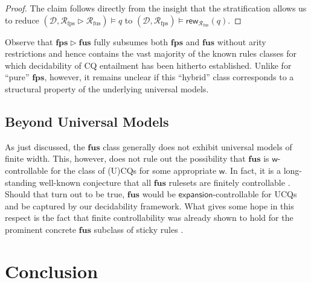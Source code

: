 \documentclass[10pt,a4paper]{amsart}
\theoremstyle{definition}
\numberwithin{equation}{section}
\theoremstyle{plain}
\theoremstyle{definition}
\theoremstyle{myexample}
\theoremstyle{plain}
\theoremstyle{definition}
\newcommand{\database}{\mathcal{D}}
\newcommand{\db}{\database}
\newcommand{\cut}{\triangleright}
\newcommand{\fcn}[1]{\mathsf{#1}}
\newcommand{\ruleset}{\calr}
\newcommand{\fus}{\mathbf{fus}}
\newcommand{\fps}{\mathbf{fps}} %
\newcommand{\hcs}{\fps}
\newcommand{\fhcs}{\hcs}
\newcommand{\rewrs}[2]{\fcn{rew}_{#1}(#2)}
\newcommand{\calr}{\mathcal{R}}
\newcommand{\query}{q}
\begin{document}
\begin{proof} The claim follows directly from the insight that the stratification allows us to reduce  $(\db,\ruleset_\mathrm{fps} \cut \ruleset_\mathrm{fus}) \models \query$ to
$(\db,\ruleset_\mathrm{fps}) \models \rewrs{\ruleset_\mathrm{fus}}{\query}$.
\end{proof}

Observe that $\fhcs \cut \fus$ fully subsumes both $\fhcs$ and $\fus$ without arity restrictions and hence contains the vast majority of the known rules classes for which decidability of CQ entailment has been hitherto established. Unlike for ``pure'' $\fhcs$, however, it remains unclear if this ``hybrid'' class corresponds to a structural property of the underlying universal models.  


\subsection{Beyond Universal Models}
%
As just discussed, the $\fus$ class generally does not exhibit universal models of finite width. This, however, does not rule out the possibility that $\fus$ is $\fcn{w}$-controllable for the class of (U)CQs for some appropriate $\fcn{w}$. In fact, it is a long-standing well-known conjecture that all $\fus$ rulesets are finitely controllable \cite{GogaczM13a,GogaczM13}. Should that turn out to be true, $\fus$ would be $\fcn{expansion}$-controllable for UCQs and be captured by our decidability framework. What gives some hope in this respect is the fact that finite controllability was already shown to hold for the prominent concrete $\fus$ subclass of sticky rules \cite{GogaczM13a,GogaczM17}. %


  
  


\section{Conclusion}
\end{document}
